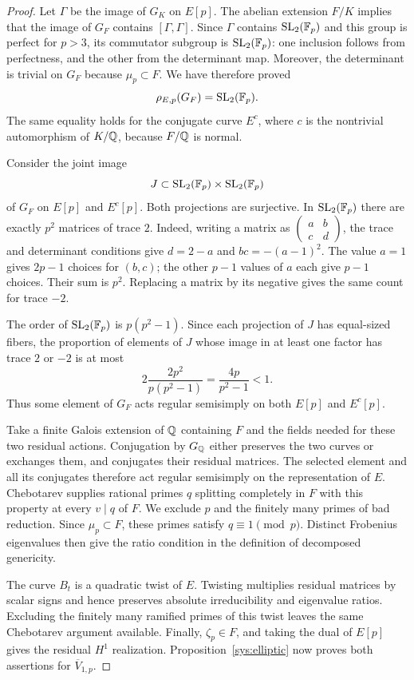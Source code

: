 \begin{proof}
Let $\Gamma$ be the image of $G_K$ on $E[p]$.
The abelian extension $F/K$ implies that the image of $G_F$
contains $[\Gamma,\Gamma]$.  Since $\Gamma$ contains
$\operatorname{SL}_2(\mathbb F_p)$ and this group is perfect for $p>3$, its commutator
subgroup is $\operatorname{SL}_2(\mathbb F_p)$: one inclusion follows from
perfectness, and the other from the determinant map.
Moreover, the determinant is trivial on $G_F$ because
$\mu_p\subset F$.  We have therefore proved
\begin{equation}\label{res:SL2-image}
 \rho_{E,p}(G_F)=\operatorname{SL}_2(\mathbb F_p).
\end{equation}
The same equality holds for the conjugate curve $E^c$, where $c$
is the nontrivial automorphism of $K/\mathbb Q$, because $F/\mathbb Q$ is normal.

Consider the joint image
\[
 J\subset\operatorname{SL}_2(\mathbb F_p)\times\operatorname{SL}_2(\mathbb F_p)
\]
of $G_F$ on $E[p]$ and $E^c[p]$.  Both projections are surjective.
In $\operatorname{SL}_2(\mathbb F_p)$ there are exactly $p^2$ matrices of trace $2$.
Indeed, writing a matrix as $\left(\begin{smallmatrix}a&b\\c&d
\end{smallmatrix}\right)$, the trace and determinant conditions
give $d=2-a$ and $bc=-(a-1)^2$.  The value $a=1$ gives $2p-1$
choices for $(b,c)$; the other $p-1$ values of $a$ each give
$p-1$ choices.  Their sum is $p^2$.  Replacing a matrix by its
negative gives the same count for trace $-2$.

The order of $\operatorname{SL}_2(\mathbb F_p)$ is $p(p^2-1)$.  Since each projection
of $J$ has equal-sized fibers, the proportion of elements of $J$
whose image in at least one factor has trace $2$ or $-2$ is at most
\[
 2\frac{2p^2}{p(p^2-1)}
 =\frac{4p}{p^2-1}<1.
\]
Thus some element of $G_F$ acts regular semisimply on both
$E[p]$ and $E^c[p]$.

Take a finite Galois extension of $\mathbb Q$ containing $F$ and the
fields needed for these two residual actions.  Conjugation by
$G_\mathbb Q$ either preserves the two curves or exchanges them, and
conjugates their residual matrices.  The selected element and all
its conjugates therefore act regular semisimply on the
representation of $E$.  Chebotarev supplies rational primes $q$
splitting completely in $F$ with this property at every $v\mid q$
of $F$.  We exclude $p$ and the finitely many primes of bad
reduction.  Since $\mu_p\subset F$, these primes satisfy
$q\equiv1\pmod p$.  Distinct Frobenius eigenvalues then give the
ratio condition in the definition of decomposed genericity.

The curve $B_t$ is a quadratic twist of $E$.  Twisting multiplies
residual matrices by scalar signs and hence preserves absolute
irreducibility and eigenvalue ratios.  Excluding the finitely many
ramified primes of this twist leaves the same Chebotarev argument
available.  Finally, $\zeta_p\in F$, and taking the dual of $E[p]$
gives the residual $H^1$ realization.  Proposition~\ref{sys:elliptic}
now proves both assertions for $\overline V_{1,p}$.
\end{proof}

